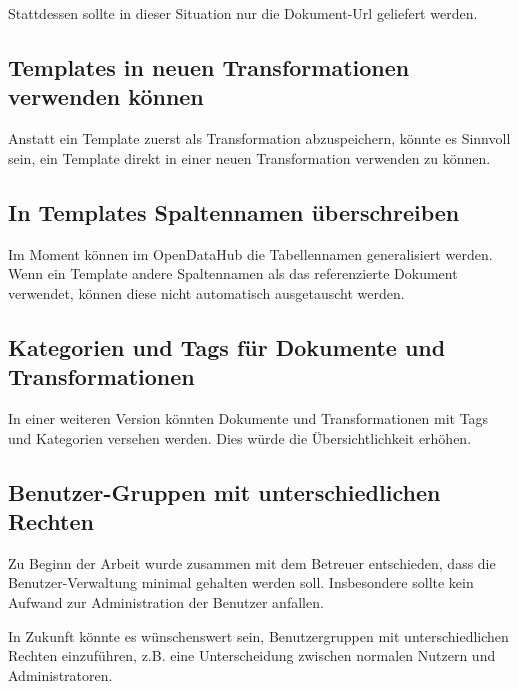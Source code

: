Stattdessen sollte in dieser Situation nur die Dokument-Url geliefert werden.
\subsection{Templates in neuen Transformationen verwenden können}
Anstatt ein Template zuerst als Transformation abzuspeichern, könnte es Sinnvoll sein, ein Template direkt in einer neuen Transformation verwenden zu können.

\subsection{In Templates Spaltennamen überschreiben}
Im Moment können im OpenDataHub die Tabellennamen generalisiert werden. Wenn ein Template andere Spaltennamen als das referenzierte Dokument verwendet, können diese nicht automatisch ausgetauscht werden.

\subsection{Kategorien und Tags für Dokumente und Transformationen}
In einer weiteren Version könnten Dokumente und Transformationen mit Tags und Kategorien versehen werden. Dies würde die Übersichtlichkeit erhöhen.

\subsection{Benutzer-Gruppen mit unterschiedlichen Rechten}
Zu Beginn der Arbeit wurde zusammen mit dem Betreuer entschieden, dass die Benutzer-Verwaltung minimal gehalten werden soll. Insbesondere sollte kein Aufwand zur Administration der Benutzer anfallen.

In Zukunft könnte es wünschenswert sein, Benutzergruppen mit unterschiedlichen Rechten einzuführen, z.B. eine Unterscheidung zwischen normalen Nutzern und Administratoren.